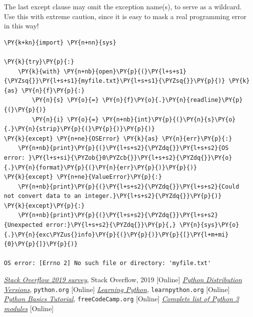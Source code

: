The last except clause may omit the exception name(s), to serve as a wildcard.
Use this with extreme caution, since it is easy to mask a real programming 
error in this way! 

\begin{tcolorbox}[breakable, size=fbox, boxrule=1pt, pad at break*=1mm,colback=cellbackground, colframe=cellborder]
\begin{Verbatim}[commandchars=\\\{\}]
\PY{k+kn}{import} \PY{n+nn}{sys}
	
\PY{k}{try}\PY{p}{:}
    \PY{k}{with} \PY{n+nb}{open}\PY{p}{(}\PY{l+s+s1}{\PYZsq{}}\PY{l+s+s1}{myfile.txt}\PY{l+s+s1}{\PYZsq{}}\PY{p}{)} \PY{k}{as} \PY{n}{f}\PY{p}{:}
        \PY{n}{s} \PY{o}{=} \PY{n}{f}\PY{o}{.}\PY{n}{readline}\PY{p}{(}\PY{p}{)}
        \PY{n}{i} \PY{o}{=} \PY{n+nb}{int}\PY{p}{(}\PY{n}{s}\PY{o}{.}\PY{n}{strip}\PY{p}{(}\PY{p}{)}\PY{p}{)}
\PY{k}{except} \PY{n+ne}{OSError} \PY{k}{as} \PY{n}{err}\PY{p}{:}
    \PY{n+nb}{print}\PY{p}{(}\PY{l+s+s2}{\PYZdq{}}\PY{l+s+s2}{OS error: }\PY{l+s+si}{\PYZob{}0\PYZcb{}}\PY{l+s+s2}{\PYZdq{}}\PY{o}{.}\PY{n}{format}\PY{p}{(}\PY{n}{err}\PY{p}{)}\PY{p}{)}
\PY{k}{except} \PY{n+ne}{ValueError}\PY{p}{:}
    \PY{n+nb}{print}\PY{p}{(}\PY{l+s+s2}{\PYZdq{}}\PY{l+s+s2}{Could not convert data to an integer.}\PY{l+s+s2}{\PYZdq{}}\PY{p}{)}
\PY{k}{except}\PY{p}{:}
    \PY{n+nb}{print}\PY{p}{(}\PY{l+s+s2}{\PYZdq{}}\PY{l+s+s2}{Unexpected error:}\PY{l+s+s2}{\PYZdq{}}\PY{p}{,} \PY{n}{sys}\PY{o}{.}\PY{n}{exc\PYZus{}info}\PY{p}{(}\PY{p}{)}\PY{p}{[}\PY{l+m+mi}{0}\PY{p}{]}\PY{p}{)}
	
OS error: [Errno 2] No such file or directory: 'myfile.txt'
\end{Verbatim}
\end{tcolorbox}

\begin{thebibliography}{9}
 \href{https://insights.stackoverflow.com/survey/2019}{\emph{Stack Overflow 2019 survey}}, Stack Overflow, 2019 [Online]
 \href{https://www.python.org/downloads/}{\emph{Python Distribution Versions}}, \texttt{python.org} [Online]
 \href{https://www.learnpython.org/it/}{\emph{Learning Python}}, \texttt{learnpython.org} [Online]
 \href{https://www.youtube.com/watch?v=8DvywoWv6fI}{\emph{Python Basics Tutorial}}, \texttt{freeCodeCamp.org} [Online]
 \href{https://docs.python.org/3/py-modindex.html}{\emph{Complete list of Python 3 modules}} [Online]
\end{thebibliography}
